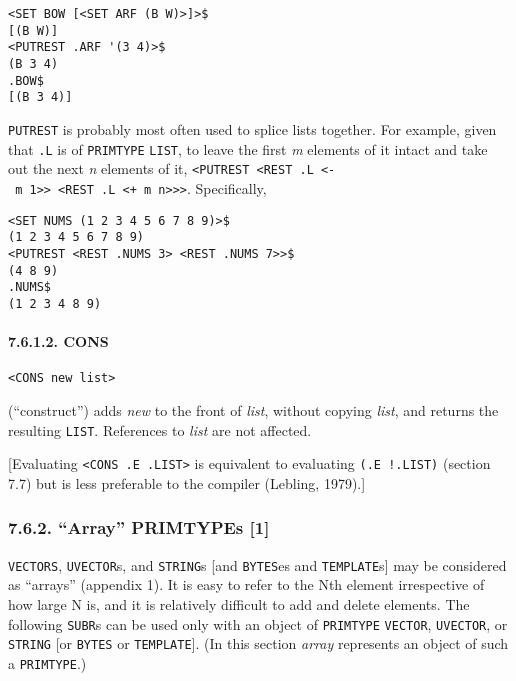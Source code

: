 \documentclass[a4paper,]{article}
\let\oldparagraph\paragraph
\renewcommand{\paragraph}[1]{\oldparagraph{#1}\mbox{}}
\begin{document}
\begin{verbatim}
<SET BOW [<SET ARF (B W)>]>$
[(B W)]
<PUTREST .ARF '(3 4)>$
(B 3 4)
.BOW$
[(B 3 4)]
\end{verbatim}

\texttt{PUTREST} is probably most often used to splice lists together. For example, given that \texttt{.L} is of
\texttt{PRIMTYPE} \texttt{LIST}, to leave the first \emph{m} elements of it intact and take out the next \emph{n} elements
of it,
\texttt{\textless{}PUTREST\ \textless{}REST\ .L\ \textless{}-\ m\ 1\textgreater{}\textgreater{}\ \textless{}REST\ .L\ \textless{}+\ m\ n\textgreater{}\textgreater{}\textgreater{}}.
Specifically,

\begin{verbatim}
<SET NUMS (1 2 3 4 5 6 7 8 9)>$
(1 2 3 4 5 6 7 8 9)
<PUTREST <REST .NUMS 3> <REST .NUMS 7>>$
(4 8 9)
.NUMS$
(1 2 3 4 8 9)
\end{verbatim}

\paragraph{7.6.1.2. CONS}\label{cons}

\begin{verbatim}
<CONS new list>
\end{verbatim}

 (``construct'') adds \emph{new} to the front of \emph{list}, without copying \emph{list}, and
returns the resulting \texttt{LIST}. References to \emph{list} are not affected.

{[}Evaluating \texttt{\textless{}CONS\ .E\ .LIST\textgreater{}} is equivalent to evaluating \texttt{(.E\ !.LIST)} (section
7.7) but is less preferable to the compiler (Lebling, 1979).{]}

\subsubsection{\texorpdfstring{7.6.2. ``Array'' PRIMTYPEs
{[}1{]}}{7.6.2. Array PRIMTYPEs {[}1{]}}}\label{array-primtypes-1}

\texttt{VECTORS}, \texttt{UVECTOR}s, and \texttt{STRING}s {[}and \texttt{BYTES}es and \texttt{TEMPLATE}s{]} may be
considered as ``arrays'' (appendix 1). It is easy to refer to the Nth element irrespective of how large N is, and it is
relatively difficult to add and delete elements. The following \texttt{SUBR}s can be used only with an object of
\texttt{PRIMTYPE} \texttt{VECTOR}, \texttt{UVECTOR}, or \texttt{STRING} {[}or \texttt{BYTES} or \texttt{TEMPLATE}{]}. (In
this section \emph{array} represents an object of such a \texttt{PRIMTYPE}.)
\end{document}
